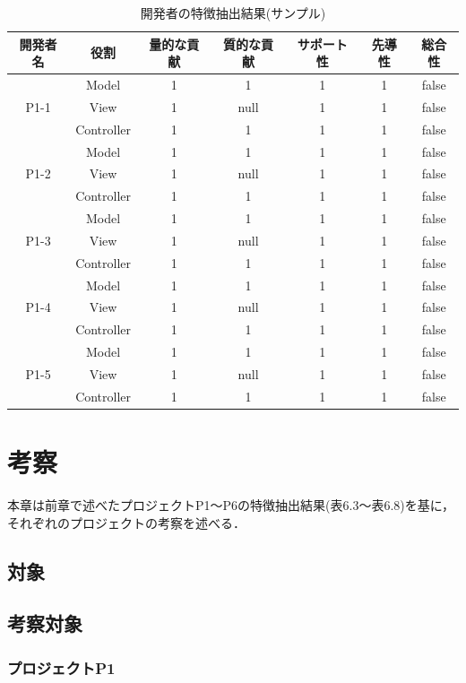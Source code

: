 \documentclass{funthesis}
\begin{document}
\begin{table}[htb]
  \begin{center}
\begin{tabular}{|c|c|c|c|c|c|c|}
\hline
開発者名 & 役割 & 量的な貢献 & 質的な貢献 & サポート性 & 先導性 & 総合性\\ \hline
& Model & 1 & 1 & 1 & 1 & false\\ \cline{2-7}
P1-1 & View & 1 & null & 1 & 1 & false\\ \cline{2-7}
& Controller & 1 & 1 & 1 & 1 & false \\ \hline \hline
& Model & 1 & 1 & 1 & 1 & false\\ \cline{2-7}
P1-2 & View & 1 & null & 1 & 1 & false\\ \cline{2-7}
& Controller & 1 & 1 & 1 & 1 & false \\ \hline \hline
& Model & 1 & 1 & 1 & 1 & false\\ \cline{2-7}
P1-3 & View & 1 & null & 1 & 1 & false\\ \cline{2-7}
& Controller & 1 & 1 & 1 & 1 & false \\ \hline \hline
& Model & 1 & 1 & 1 & 1 & false\\ \cline{2-7}
P1-4 & View & 1 & null& 1 & 1 & false\\ \cline{2-7}
& Controller & 1 & 1 & 1 & 1 & false \\ \hline \hline
& Model & 1 & 1 & 1 & 1 & false\\ \cline{2-7}
P1-5 & View & 1 & null & 1 & 1 & false\\ \cline{2-7}
& Controller & 1 & 1 & 1 & 1 & false \\ \hline
\end{tabular}
  \end{center}
  \caption{開発者の特徴抽出結果(サンプル)}    \label{sample}
\end{table}

\chapter{考察}
本章は前章で述べたプロジェクトP1〜P6の特徴抽出結果(表6.3〜表6.8)を基に，それぞれのプロジェクトの考察を述べる．
\section{対象}
\section{考察対象}
\subsection{プロジェクトP1}
\end{document}
